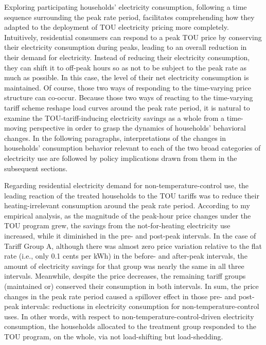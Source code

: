 Exploring participating households' electricity consumption, following a time sequence surrounding the peak rate period, facilitates comprehending how they adapted to the deployment of TOU electricity pricing more completely. Intuitively, residential consumers can respond to a peak TOU price by conserving their electricity consumption during peaks, leading to an overall reduction in their demand for electricity. Instead of reducing their electricity consumption, they can shift it to off-peak hours so as not to be subject to the peak rate as much as possible. In this case, the level of their net electricity consumption is maintained. Of course, those two ways of responding to the time-varying price structure can co-occur. Because those two ways of reacting to the time-varying tariff scheme reshape load curves around the peak rate period, it is natural to examine the TOU-tariff-inducing electricity savings as a whole from a time-moving perspective in order to grasp the dynamics of households' behavioral changes. In the following paragraphs, interpretations of the changes in households' consumption behavior relevant to each of the two broad categories of electricity use are followed by policy implications drawn from them in the subsequent sections. 

Regarding residential electricity demand for non-temperature-control use, the leading reaction of the treated households to the TOU tariffs was to reduce their heating-irrelevant consumption around the peak rate period. According to my empirical analysis, as the magnitude of the peak-hour price changes under the TOU program grew, the savings from the not-for-heating electricity use increased, while it diminished in the pre- and post-peak intervals. In the case of Tariff Group A, although there was almost zero price variation relative to the flat rate (i.e., only 0.1 cents per kWh) in the before- and after-peak intervals, the amount of electricity savings for that group was nearly the same in all three intervals. Meanwhile, despite the price decreases, the remaining tariff groups (maintained or) conserved their consumption in both intervals. In sum, the price changes in the peak rate period caused a spillover effect in those pre- and post-peak intervals: reductions in electricity consumption for non-temperature-control uses. In other words, with respect to non-temperature-control-driven electricity consumption, the households allocated to the treatment group responded to the TOU program, on the whole, via not load-shifting but load-shedding. 

